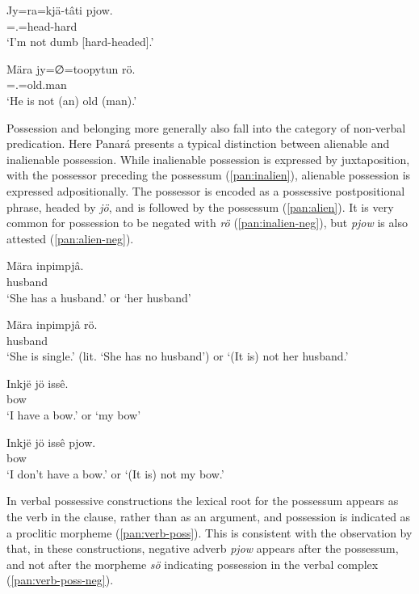 \documentclass[output=paper,colorlinks,citecolor=brown,draft]{langscibook}
\begin{document}
\ea\label{pan:att-neg1}
    \gll Jy=ra=kjä-tâti pjow. \\
    \Intr{}=\Fsg.\Abs{}=head-hard \Neg{} \\
    \glt `I'm not dumb [hard-headed].' \\
\z

\ea\label{pan:att-neg2}
    \gll Mära jy=∅=toopytun rö. \\
    \Tsg{} \Intr{}=\Tsg.\Abs{}=old.man \Neg{} \\
    \glt `He is not (an) old (man).' \\
\z

Possession and belonging more generally also fall into the category of non-verbal predication. Here Panará presents a typical distinction between alienable and inalienable possession. While inalienable possession is expressed by juxtaposition, with the possessor preceding the possessum (\ref{pan:inalien}), alienable possession \citep{NicholsBickel2013-wals59} is expressed adpositionally. The possessor is encoded as a possessive postpositional phrase, headed by \textit{jö}, and is followed by the possessum (\ref{pan:alien}). It is very common for possession to be negated with \textit{rö} (\ref{pan:inalien-neg}), but \textit{pjow} is also attested (\ref{pan:alien-neg}).

\ea\label{pan:inalien}
    \gll Mära inpimpjâ. \\
    \Tsg{} husband  \\
    \glt `She has a husband.' or `her husband' \\
\z

\ea\label{pan:inalien-neg}
    \gll Mära inpimpjâ rö. \\
    \Tsg{} husband \Neg{} \\
    \glt `She is single.' (lit. `She has no husband') or `(It is) not her husband.'  \\ 
\z

\ea\label{pan:alien}
    \gll Inkjë jö issê. \\
    \Fsg{} \Poss{} bow  \\
    \glt `I have a bow.' or `my bow' \\
\z

\ea\label{pan:alien-neg}
    \gll Inkjë jö issê pjow. \\
    \Fsg{} \Poss{} bow \Neg{}  \\
    \glt `I don't have a bow.' or `(It is) not my bow.' \\
\z

In verbal possessive constructions the lexical root for the possessum appears as the verb in the clause, rather than as an argument, and possession is indicated as a proclitic morpheme (\ref{pan:verb-poss}). This is consistent with the observation by \citet[76]{Dourado2001} that, in these constructions, negative adverb \textit{pjow} appears after the possessum, and not after the morpheme \textit{sö} indicating possession in the verbal complex (\ref{pan:verb-poss-neg}).
\end{document}
